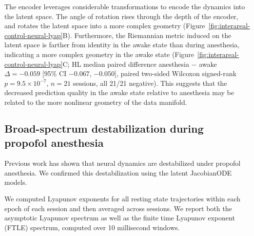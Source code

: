 The encoder leverages considerable transformations to encode the dynamics into the latent space. The angle of rotation rises through the depth of the encoder, and rotates the latent space into a more complex geometry (Figure~\ref{fig:interareal-control-neural-lyap}B). Furthermore, the Riemannian metric induced on the latent space is farther from identity in the awake state than during anesthesia, indicating a more complex geometry in the awake state (Figure~\ref{fig:interareal-control-neural-lyap}C; HL median paired difference anesthesia $-$ awake $\Delta=-0.059$ [95\% CI $-0.067$, $-0.050$], paired two-sided Wilcoxon signed-rank $p=9.5\!\times\!10^{-7}$, $n=21$ sessions, all 21/21 negative). This suggests that the decreased prediction quality in the awake state relative to anesthesia may be related to the more nonlinear geometry of the data manifold.

\subsection{Broad-spectrum destabilization during propofol anesthesia}
\label{sec:interareal-control-lyapunov}

Previous work has shown that neural dynamics are destabilized under propofol anesthesia.\cite{Eisen2024-vc, Eisen2026-cw} We confirmed this destabilization using the latent JacobianODE models.

We computed Lyapunov exponents for all resting state trajectories within each epoch of each session and then averaged across sessions. We report both the asymptotic Lyapunov spectrum as well as the finite time Lyapunov exponent (FTLE) spectrum, computed over 10 millisecond windows.

